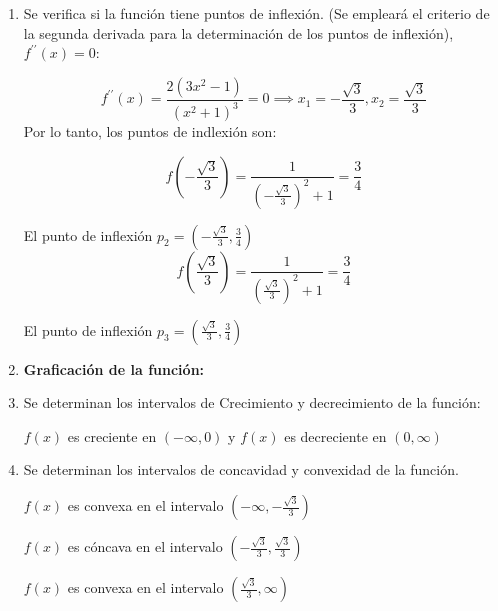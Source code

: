 \begin{enumerate}


	\item Se verifica si la función tiene puntos de inflexión. (Se empleará el criterio de la segunda derivada para la determinación de los puntos de inflexión), $f^{\prime\prime}(x)=0$:

	      \begin{equation*}
		      f^{\prime\prime}(x)=\frac{2\left( 3x^2-1\right)}{\left(x^2+1 \right)^3}=0\implies x_{1}=-\frac{\sqrt{3}}{3},x_{2}=\frac{\sqrt{3}}{3}
	      \end{equation*}
	      Por lo tanto, los puntos de indlexión son:

	      \begin{equation*}
		      f\left(-\frac{\sqrt{3}}{3} \right)=\frac{1}{\left(-\frac{\sqrt{3}}{3} \right)^2+1}=\frac{3}{4}
	      \end{equation*}

	      El punto de inflexión $p_{2}=\left(-\frac{\sqrt{3}}{3},\frac{3}{4} \right)$
	      \begin{equation*}
		      f\left(\frac{\sqrt{3}}{3} \right)=\frac{1}{\left(\frac{\sqrt{3}}{3} \right)^2+1}=\frac{3}{4}
	      \end{equation*}

	      El punto de inflexión $p_{3}=\left(\frac{\sqrt{3}}{3},\frac{3}{4} \right)$

	\item \textbf{Graficación de la función:} %
	\item Se determinan los intervalos de Crecimiento y decrecimiento de la función:

	      $f(x)$ es creciente en $(-\infty, 0)$ y $f(x)$ es decreciente en $(0, \infty)$

	\item Se determinan los intervalos de concavidad y convexidad de la función.

	      $f(x)$ es convexa en el intervalo $\left(-\infty, -\frac{\sqrt{3}}{3}\right)$

	      $f(x)$ es cóncava en el intervalo $\left(-\frac{\sqrt{3}}{3}, \frac{\sqrt{3}}{3}\right)$

	      $f(x)$ es convexa en el intervalo $\left(\frac{\sqrt{3}}{3}, \infty\right)$

\end{enumerate}

